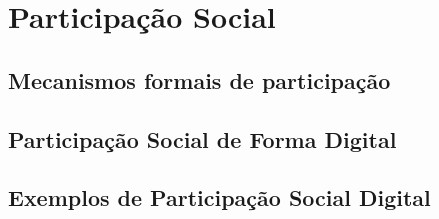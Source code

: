 \chapter{Participação Social}

\section{Mecanismos formais de participação}

\section{Participação Social de Forma Digital}

\section{Exemplos de Participação Social Digital}

